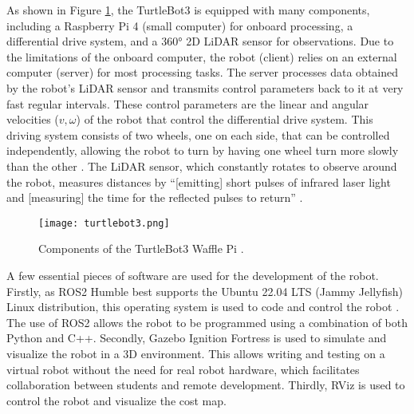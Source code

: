 As shown in Figure \ref{fig:turtlebot3}, the TurtleBot3 is equipped with many components, including a Raspberry Pi 4 (small computer) for onboard processing, a differential drive system, and a 360° 2D LiDAR sensor for observations. Due to the limitations of the onboard computer, the robot (client) relies on an external computer (server) for most processing tasks. The server processes data obtained by the robot's LiDAR sensor and transmits control parameters back to it at very fast regular intervals. These control parameters are the linear and angular velocities ($v,\omega$) of the robot that control the differential drive system. This driving system consists of two wheels, one on each side, that can be controlled independently, allowing the robot to turn by having one wheel turn more slowly than the other \parencite{corkeRoboticsVisionControl2023}. The LiDAR sensor, which constantly rotates to observe around the robot, measures distances by ``[emitting] short pulses of infrared laser light and [measuring] the time for the reflected pulses to return'' \parencite{corkeRoboticsVisionControl2023}.

\begin{figure}[!htb]
    \texttt{[image: turtlebot3.png]}
    \centering
    \caption{Components of the TurtleBot3 Waffle Pi \parencite{ROBOTISEManual}.}
    \label{fig:turtlebot3}
\end{figure}

A few essential pieces of software are used for the development of the robot. Firstly, as ROS2 Humble best supports the Ubuntu 22.04 LTS (Jammy Jellyfish) Linux distribution, this operating system is used to code and control the robot \parencite{InstallationROSDocumentation}. The use of ROS2 allows the robot to be programmed using a combination of both Python and C++. Secondly, Gazebo Ignition Fortress is used to simulate and visualize the robot in a 3D environment. This allows writing and testing on a virtual robot without the need for real robot hardware, which facilitates collaboration between students and remote development. Thirdly, RViz is used to control the robot and visualize the cost map.